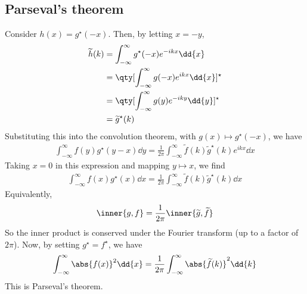 \subsection{Parseval's theorem}
Consider $h(x) = g^\star(-x)$.
Then, by letting $x = -y$,
\begin{align*}
	\widetilde h(k) & = \int_{-\infty}^\infty g^\star(-x) e^{-ikx} \dd{x}      \\
	                & = \qty[\int_{-\infty}^\infty g(-x) e^{ikx} \dd{x}]^\star \\
	                & = \qty[\int_{-\infty}^\infty g(y) e^{-iky} \dd{y}]^\star \\
	                & = \widetilde g^\star(k)
\end{align*}
Substituting this into the convolution theorem, with $g(x) \mapsto g^\star(-x)$, we have
\begin{align*}
	\int_{-\infty}^\infty f(y) g^\star(y-x) \dd{y} = \frac{1}{2\pi} \int_{-\infty}^\infty \widetilde f(k) \widetilde g^\star(k) e^{ikx} \dd{x}
\end{align*}
Taking $x = 0$ in this expression and mapping $y \mapsto x$, we find
\begin{align*}
	\int_{-\infty}^\infty f(x) g^\star(x) \dd{x} = \frac{1}{2\pi} \int_{-\infty}^\infty \widetilde f(k) \widetilde g^\star(k) \dd{x}
\end{align*}
Equivalently,
\begin{align*}
	\inner{g,f} = \frac{1}{2\pi} \inner{\widetilde g, \widetilde f}
\end{align*}
So the inner product is conserved under the Fourier transform (up to a factor of $2 \pi$).
Now, by setting $g^\star = f^\star$, we have
\begin{align*}
	\int_{-\infty}^\infty \abs{f(x)}^2 \dd{x} = \frac{1}{2\pi} \int_{-\infty}^\infty \abs{\widetilde f(k)}^2 \dd{k}
\end{align*}
This is Parseval's theorem.

